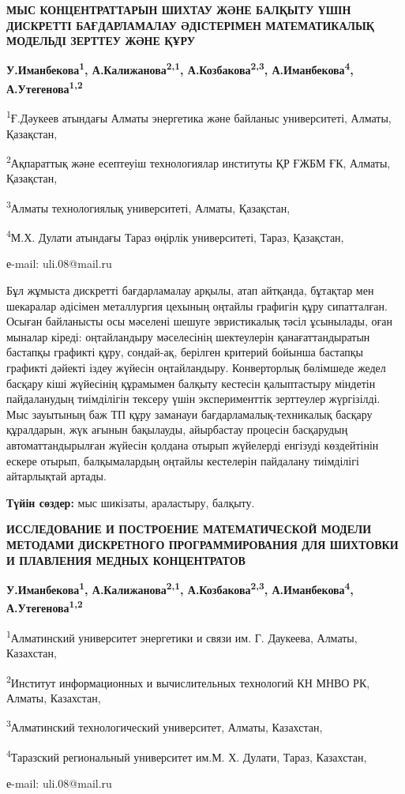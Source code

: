 \begin{center}
{\large\bfseries МЫС КОНЦЕНТРАТТАРЫН ШИХТАУ ЖӘНЕ БАЛҚЫТУ ҮШІН ДИСКРЕТТІ
БАҒДАРЛАМАЛАУ ӘДІСТЕРІМЕН МАТЕМАТИКАЛЫҚ МОДЕЛЬДІ ЗЕРТТЕУ ЖӘНЕ ҚҰРУ}

{\bfseries У.Иманбекова\textsuperscript{1},
А.Калижанова\textsuperscript{2,1}, А.Козбакова\textsuperscript{2,3},
А.Иманбекова\textsuperscript{4}, А.Утегенова\textsuperscript{1,2}}

\textsuperscript{1}Ғ.Дәукеев атындағы Алматы энергетика және байланыс
университеті, Алматы, Қазақстан,

\textsuperscript{2}Ақпараттық және есептеуіш технологиялар институты ҚР
ҒЖБМ ҒК, Алматы, Қазақстан,

\textsuperscript{3}Алматы технологиялық университеті, Алматы, Қазақстан,

\textsuperscript{4}М.Х. Дулати атындағы Тараз өңірлік университеті,
Тараз, Қазақстан,

е-mail: uli.08@mail.ru
\end{center}

Бұл жұмыста дискретті бағдарламалау арқылы, атап айтқанда, бұтақтар мен
шекаралар әдісімен металлургия цехының оңтайлы графигін құру
сипатталған. Осыған байланысты осы мәселені шешуге эвристикалық тәсіл
ұсынылады, оған мыналар кіреді: оңтайландыру мәселесінің шектеулерін
қанағаттандыратын бастапқы графикті құру, сондай-ақ, берілген критерий
бойынша бастапқы графикті дәйекті іздеу жүйесін оңтайландыру.
Конверторлық бөлімшеде жедел басқару кіші жүйесінің құрамымен балқыту
кестесін қалыптастыру міндетін пайдаланудың тиімділігін тексеру үшін
эксперименттік зерттеулер жүргізілді. Мыс зауытының баж ТП құру заманауи
бағдарламалық-техникалық басқару құралдарын, жүк ағынын бақылауды,
айырбастау процесін басқарудың автоматтандырылған жүйесін қолдана отырып
жүйелерді енгізуді көздейтінін ескере отырып, балқымалардың оңтайлы
кестелерін пайдалану тиімділігі айтарлықтай артады.

{\bfseries Түйін сөздер:} мыс шикізаты, араластыру, балқыту.

\begin{center}
{\large\bfseries ИССЛЕДОВАНИЕ И ПОСТРОЕНИЕ МАТЕМАТИЧЕСКОЙ МОДЕЛИ МЕТОДАМИ
ДИСКРЕТНОГО ПРОГРАММИРОВАНИЯ ДЛЯ ШИХТОВКИ И ПЛАВЛЕНИЯ МЕДНЫХ
КОНЦЕНТРАТОВ}

{\bfseries У.Иманбекова\textsuperscript{1},
А.Калижанова\textsuperscript{2,1}, А.Козбакова\textsuperscript{2,3},
А.Иманбекова\textsuperscript{4}, А.Утегенова\textsuperscript{1,2}}

\textsuperscript{1}Алматинский университет энергетики и связи им. Г.
Даукеева, Алматы, Казахстан,

\textsuperscript{2}Институт информационных и вычислительных технологий
КН МНВО РК, Алматы, Казахстан,

\textsuperscript{3}Алматинский технологический университет, Алматы,
Казахстан,

\textsuperscript{4}Таразский региональный университет им.М. Х. Дулати,
Тараз, Казахстан,

е-mail: uli.08@mail.ru
\end{center}


